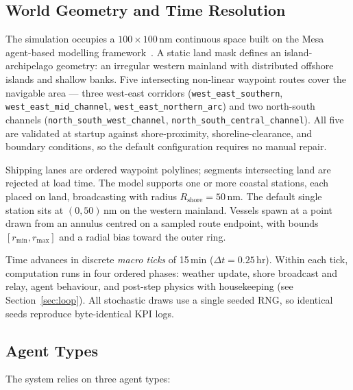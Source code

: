 \documentclass[cameraready]{Interspeech}
\begin{document}
\subsection{World Geometry and Time Resolution}

The simulation occupies a $100 \times 100$\,nm continuous space built on the Mesa agent-based modelling framework~\cite{mesa2020}. A static land mask defines an island-archipelago geometry: an irregular western mainland with distributed offshore islands and shallow banks. Five intersecting non-linear waypoint routes cover the navigable area — three west-east corridors (\texttt{west\_east\_southern}, \texttt{west\_east\_mid\_channel}, \texttt{west\_east\_northern\_arc}) and two north-south channels (\texttt{north\_south\_west\_channel}, \texttt{north\_south\_central\_channel}). All five are validated at startup against shore-proximity, shoreline-clearance, and boundary conditions, so the default configuration requires no manual repair.

Shipping lanes are ordered waypoint polylines; segments intersecting land are rejected at load time. The model supports one or more coastal stations, each placed on land, broadcasting with radius $R_\text{shore} = 50$\,nm. The default single station sits at $(0, 50)$\,nm on the western mainland. Vessels spawn at a point drawn from an annulus centred on a sampled route endpoint, with bounds $[r_\text{min}, r_\text{max}]$ and a radial bias toward the outer ring.

Time advances in discrete \emph{macro ticks} of 15\,min ($\Delta t = 0.25$\,hr). Within each tick, computation runs in four ordered phases: weather update, shore broadcast and relay, agent behaviour, and post-step physics with housekeeping (see Section~\ref{sec:loop}). All stochastic draws use a single seeded RNG, so identical seeds reproduce byte-identical KPI logs.

\subsection{Agent Types}

The system relies on three agent types:
\end{document}
